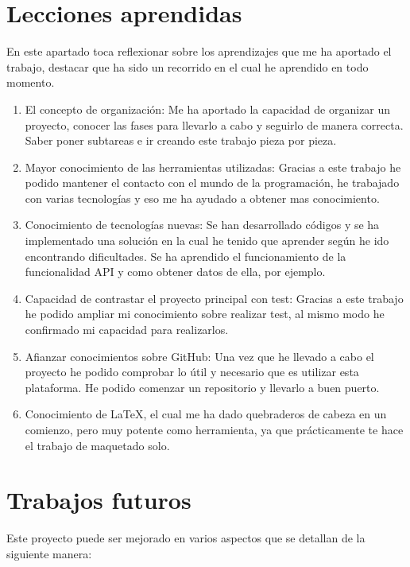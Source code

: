 \documentclass[a4paper, 12pt]{book}
\begin{document}
\section{Lecciones aprendidas}
\label{sec:lecciones_aprendidas}

En este apartado toca reflexionar sobre los aprendizajes que me ha aportado el trabajo, destacar que ha sido un recorrido en el cual he aprendido en todo momento.

\begin{enumerate}
  \item El concepto de organización: Me ha aportado la capacidad de organizar un proyecto, conocer las fases para llevarlo a cabo y seguirlo de manera correcta. Saber poner subtareas e ir creando este trabajo pieza por pieza.
  \item Mayor conocimiento de las herramientas utilizadas: Gracias a este trabajo he podido mantener el contacto con el mundo de la programación, he trabajado con varias tecnologías y eso me ha ayudado a obtener mas conocimiento.
  \item Conocimiento de tecnologías nuevas: Se han desarrollado códigos y se ha implementado una solución en la cual he tenido que aprender según he ido encontrando dificultades. 
  Se ha aprendido el funcionamiento de la funcionalidad API y como obtener datos de ella, por ejemplo.
  \item Capacidad de contrastar el proyecto principal con test: Gracias a este trabajo he podido ampliar mi conocimiento sobre realizar test, al mismo modo he confirmado mi capacidad para realizarlos.
  \item Afianzar conocimientos sobre GitHub: Una vez que he llevado a cabo el proyecto he podido comprobar lo útil y necesario que es utilizar esta plataforma. He podido comenzar un repositorio y llevarlo a buen puerto.
  \item Conocimiento de \LaTeX, el cual me ha dado quebraderos de cabeza en un comienzo, pero muy potente como herramienta, ya que prácticamente te hace el trabajo de maquetado solo.
\end{enumerate}


\section{Trabajos futuros}
\label{sec:trabajos_futuros}

Este proyecto puede ser mejorado en varios aspectos que se detallan de la siguiente manera:
\end{document}
